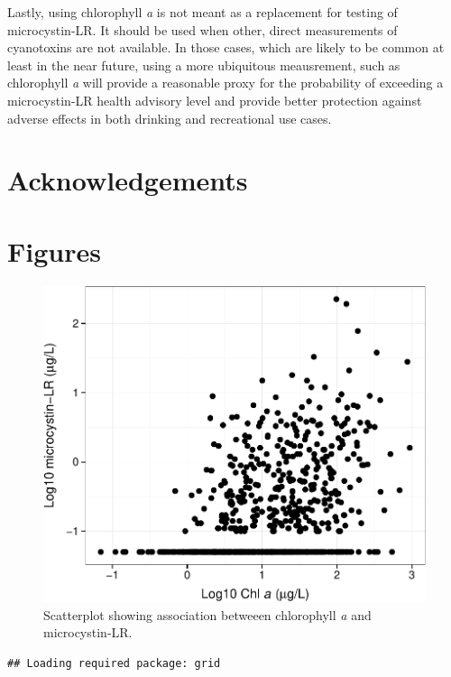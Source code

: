 \documentclass[11pt,]{article}
\begin{document}
Lastly, using chlorophyll \emph{a} is not meant as a replacement for
testing of microcystin-LR. It should be used when other, direct
measurements of cyanotoxins are not available. In those cases, which are
likely to be common at least in the near future, using a more ubiquitous
meausrement, such as chlorophyll \emph{a} will provide a reasonable
proxy for the probability of exceeding a microcystin-LR health advisory
level and provide better protection against adverse effects in both
drinking and recreational use cases.

\section{Acknowledgements}\label{acknowledgements}

\newpage

\section{Figures}\label{figures}

\begin{figure}[htbp]
\centering
\includegraphics{manuscript_files/figure-latex/chla_micro_scatter-1.pdf}
\caption{Scatterplot showing association betweeen chlorophyll \textit{a}
and microcystin-LR. \label{fig:chla_micro_scatter}}
\end{figure}

\newpage

\begin{verbatim}
## Loading required package: grid
\end{verbatim}
\end{document}
